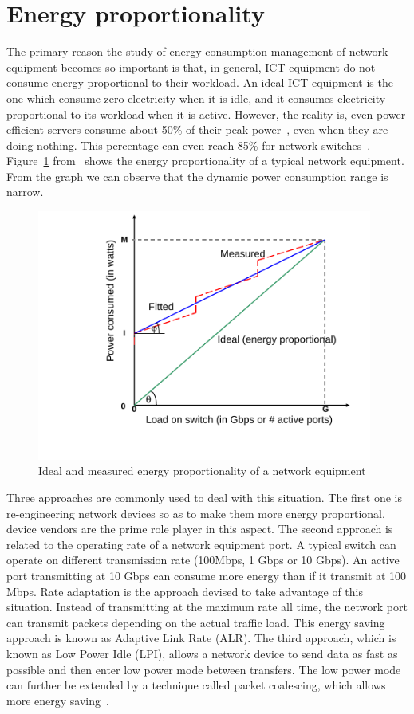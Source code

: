 \section{Energy proportionality} 
\label{section:energyproportionality}
The primary reason the study of energy consumption management of network equipment becomes so important is that, in general, ICT equipment do not consume energy proportional to their workload. An ideal ICT equipment is the one which consume zero electricity when it is idle, and it consumes electricity proportional to its workload when it is active. However, the reality is, even power efficient servers consume about 50\% of their peak power~\cite{DBLP:journals/computer/BarrosoH07}, even when they are doing nothing. This percentage can even reach 85\% for network switches~\cite{DBLP:conf/IEEEcloud/FiandrinoKBZ15}. Figure~\ref{fig:energyproportionality} from~\cite{DBLP:conf/networking/MahadevanSBR09} shows the energy proportionality of a typical network equipment. From the graph we can observe that the dynamic power consumption range is narrow.
\begin{figure}[ht]
	\begin{center}
		\includegraphics[width=11cm]{images/energyproportionality.pdf}
		\caption{Ideal and measured energy proportionality of a network equipment \cite{DBLP:conf/networking/MahadevanSBR09}}
		\label{fig:energyproportionality}
	\end{center}
\end{figure}
Three approaches are commonly used to deal with this situation. The first one is re-engineering network devices so as to make them more energy proportional, device vendors are the prime role player in this aspect. The second approach is related to the operating rate of a network equipment port. A typical switch can operate on different transmission rate (100Mbps, 1 Gbps or 10 Gbps). An active port transmitting at 10 Gbps can consume more energy than if it transmit at 100 Mbps. Rate adaptation is the approach devised to take advantage of this situation. Instead of transmitting at the maximum rate all time,  the network port can transmit packets depending on the actual traffic load. This energy saving approach is known as Adaptive Link Rate (ALR). The third approach, which is known as Low Power Idle (LPI), allows a network device to send data as fast as possible and then enter low power mode between transfers. The low power mode can further be extended by a technique called packet coalescing, which allows more energy saving~\cite{DBLP:journals/comsur/BollaBDC11}.
